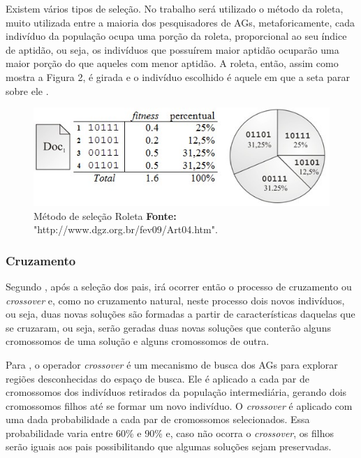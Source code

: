 \par Existem vários tipos de seleção. No trabalho será utilizado o método da
roleta, muito utilizada entre a maioria dos
pesquisadores de AGs, metaforicamente, cada indivíduo da população ocupa uma
porção da roleta, proporcional ao seu índice de aptidão, ou seja, os indivíduos
que possuírem maior aptidão ocuparão uma maior porção do que aqueles com menor
aptidão. A roleta, então, assim como mostra a Figura 2, é girada e o indivíduo
escolhido é aquele em que a seta parar sobre ele \cite{REVISTA_MULTIDISCIPLINAR_DA_UNIESP}.


\begin{figure}[h!]
	\centerline{\includegraphics[scale=1.0]{./imagens/roleta.jpg}}
	\caption[Imagem de demonstração do método de seleção Roleta]
	{Método de seleção Roleta \textbf{Fonte:}
	"http://www.dgz.org.br/fev09/Art04.htm".}
	\label{fig:exemplo2}
\end{figure}

\subsubsection{Cruzamento} 

\par Segundo , após a seleção dos pais, irá
ocorrer então o processo de cruzamento ou \textit{crossover} e, como no cruzamento natural, neste processo dois novos indivíduos, ou seja, duas
novas soluções são formadas a partir de características daquelas que se
cruzaram, ou seja, serão geradas duas novas soluções que conterão alguns cromossomos
de uma solução e alguns cromossomos de outra.

\par Para , o operador
\textit{crossover} é um mecanismo de busca dos AGs para explorar regiões
desconhecidas do espaço de busca. Ele é aplicado a cada par de cromossomos dos
indivíduos retirados da população intermediária, gerando dois cromossomos filhos até se formar um novo indivíduo. O \textit{crossover} é aplicado com uma dada probabilidade a cada par de
cromossomos selecionados.
Essa probabilidade varia entre 60\% e 90\% e, caso não ocorra o
\textit{crossover}, os filhos serão iguais aos pais possibilitando que algumas
soluções sejam preservadas.

